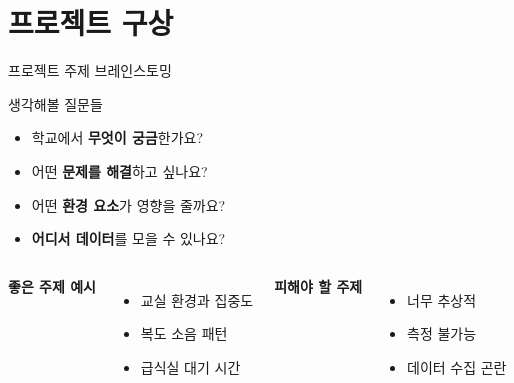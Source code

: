 \documentclass[aspectratio=169]{beamer}
\begin{document}
\section{프로젝트 구상}

\begin{frame}{프로젝트 주제 브레인스토밍}
  \begin{block}{생각해볼 질문들}
    \begin{itemize}
      \item 학교에서 \textbf{무엇이 궁금}한가요?
      \item 어떤 \textbf{문제를 해결}하고 싶나요?
      \item 어떤 \textbf{환경 요소}가 영향을 줄까요?
      \item \textbf{어디서 데이터}를 모을 수 있나요?
    \end{itemize}
  \end{block}
  
  \vspace{1em}
  
  \begin{columns}
    \textbf{좋은 주제 예시}
    \begin{itemize}
      \item 교실 환경과 집중도
      \item 복도 소음 패턴
      \item 급식실 대기 시간
    \end{itemize}
    
    \textbf{피해야 할 주제}
    \begin{itemize}
      \item 너무 추상적
      \item 측정 불가능
      \item 데이터 수집 곤란
    \end{itemize}
  \end{columns}
\end{frame}
\end{document}
